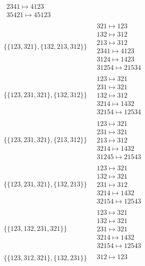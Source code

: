 \begin{scriptsize}
\begin{align}
\begin{matrix}
2341 \mapsto 4123
\\
35421 \mapsto 45123
\end{matrix}
\\
\{\{123, 321\}, \{132, 213, 312\}\}
\ 
&
\begin{matrix}
321 \mapsto 123
\\
132 \mapsto 312
\\
213 \mapsto 312
\\
2341 \mapsto 4123
\\
3124 \mapsto 1423
\\
31254 \mapsto 21534
\end{matrix}
\\
\{\{123, 231, 321\}, \{132, 312\}\}
\ 
&
\begin{matrix}
123 \mapsto 321
\\
231 \mapsto 321
\\
132 \mapsto 312
\\
3214 \mapsto 1432
\\
32154 \mapsto 12534
\end{matrix}
\\
\{\{123, 231, 321\}, \{213, 312\}\}
\ 
&
\begin{matrix}
123 \mapsto 321
\\
231 \mapsto 321
\\
213 \mapsto 312
\\
3214 \mapsto 1432
\\
31245 \mapsto 21543
\end{matrix}
\\
\{\{123, 231, 321\}, \{132, 213\}\}
\ 
&
\begin{matrix}
123 \mapsto 321
\\
132 \mapsto 321
\\
231 \mapsto 312
\\
3214 \mapsto 1432
\\
32154 \mapsto 12543
\end{matrix}
\\
\{\{123, 132, 231, 321\}\}
\ 
&
\begin{matrix}
123 \mapsto 321
\\
132 \mapsto 321
\\
231 \mapsto 321
\\
3214 \mapsto 1432
\\
32154 \mapsto 12543
\end{matrix}
\\
\{\{123, 312, 321\}, \{132, 231\}\}
\ 
&
\begin{matrix}
312 \mapsto 123
\\

\end{matrix}
\end{align}
\end{scriptsize}
